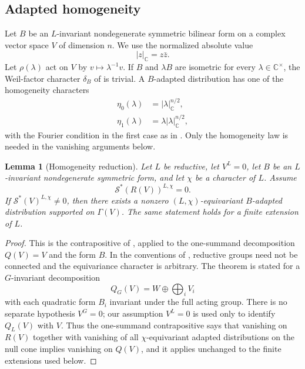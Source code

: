 \documentclass[10pt,a4paper]{amsart}
\numberwithin{equation}{section}
\newtheorem{lemma}[theorem]{Lemma}
\newcommand{\C}{\mathbb C}
\newcommand{\cS}{\mathcal S}
\newcommand{\absC}[1]{\lvert #1\rvert_{\C}}
\begin{document}
\subsection{Adapted homogeneity}

Let $B$ be an $L$-invariant nondegenerate symmetric bilinear form on a complex
vector space $V$ of dimension $n$.  We use the normalized absolute value
\[
 \absC{z}=z\bar z.
\]
Let $\rho(\lambda)$ act on $V$ by $v\mapsto\lambda^{-1}v$.  If $B$ and
$\lambda B$ are isometric for every $\lambda\in\C^\times$, the Weil-factor
character $\delta_B$ of \cite[Notation~5.1.3]{AG09} is trivial.  A
$B$-adapted distribution has one of the homogeneity characters
\begin{align}
 \eta_0(\lambda)&=\absC{\lambda}^{n/2},\label{core:eq:eta0-general}\\
 \eta_1(\lambda)&=\lambda\absC{\lambda}^{n/2},\label{core:eq:eta1-general}
\end{align}
with the Fourier condition in the first case as in
\cite[Definition~5.1.6]{AG09}.  Only the homogeneity law is needed in the
vanishing arguments below.

\begin{lemma}[Homogeneity reduction]\label{core:lem:homogeneity-reduction}
Let $L$ be reductive, let $V^L=0$, let $B$ be an $L$-invariant nondegenerate
symmetric form, and let $\chi$ be a character of $L$.  Assume
\[
 \cS^*(R(V))^{L,\chi}=0.
\]
If $\cS^*(V)^{L,\chi}\ne0$, then there exists a nonzero
$(L,\chi)$-equivariant $B$-adapted distribution supported on $\Gamma(V)$.
The same statement holds for a finite extension of $L$.
\end{lemma}

\begin{proof}
This is the contrapositive of \cite[Theorem~5.2.2]{AG09}, applied to the
one-summand decomposition $Q(V)=V$ and the form $B$.  In the conventions of
\cite{AG09}, reductive groups need not be connected and the equivariance
character is arbitrary.  The theorem is stated for a $G$-invariant
decomposition
\[
 Q_G(V)=W\oplus\bigoplus_i V_i
\]
with each quadratic form $B_i$ invariant under the full acting group.  There is
no separate hypothesis $V^G=0$; our assumption $V^L=0$ is used only to identify
$Q_L(V)$ with $V$.  Thus the one-summand contrapositive says that vanishing on
$R(V)$ together with vanishing of all $\chi$-equivariant adapted distributions
on the null cone implies vanishing on $Q(V)$, and it applies unchanged to the
finite extensions used below.
\end{proof}
\end{document}
